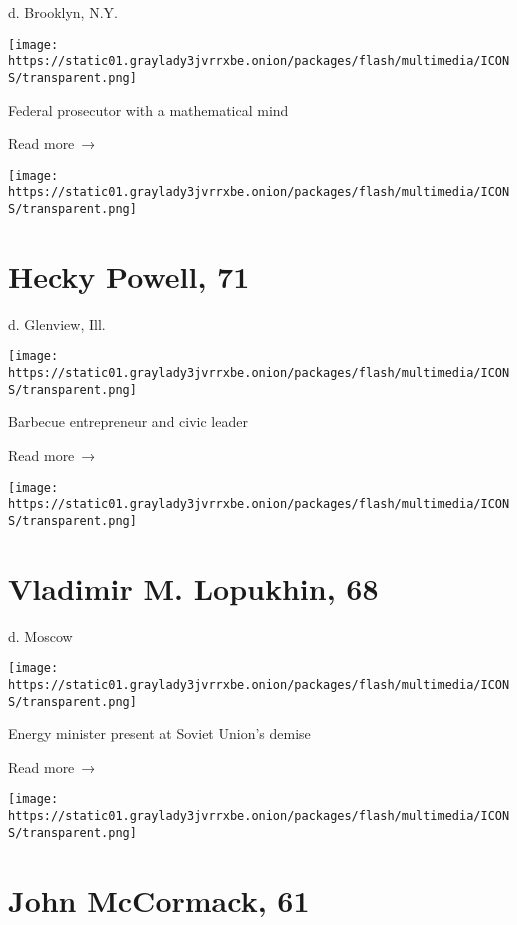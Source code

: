 d. Brooklyn, N.Y.

\texttt{[image: https://static01.graylady3jvrrxbe.onion/packages/flash/multimedia/ICONS/transparent.png]}

Federal prosecutor with a mathematical mind

 Read more~→

\href{https://www.nytimes3xbfgragh.onion/2020/06/04/us/hecky-powell-dead-coronavirus.html}{}

\texttt{[image: https://static01.graylady3jvrrxbe.onion/packages/flash/multimedia/ICONS/transparent.png]}

\hypertarget{hecky-powell-71}{%
\section{Hecky Powell, 71}\label{hecky-powell-71}}

d. Glenview, Ill.

\texttt{[image: https://static01.graylady3jvrrxbe.onion/packages/flash/multimedia/ICONS/transparent.png]}

Barbecue entrepreneur and civic leader

 Read more~→

\href{https://www.nytimes3xbfgragh.onion/2020/06/04/obituaries/vladimir-lopukhin-dead-coronavirus.html}{}

\texttt{[image: https://static01.graylady3jvrrxbe.onion/packages/flash/multimedia/ICONS/transparent.png]}

\hypertarget{vladimir-m-lopukhin-68}{%
\section{Vladimir M. Lopukhin, 68}\label{vladimir-m-lopukhin-68}}

d. Moscow

\texttt{[image: https://static01.graylady3jvrrxbe.onion/packages/flash/multimedia/ICONS/transparent.png]}

Energy minister present at Soviet Union's demise

 Read more~→

\href{https://www.nytimes3xbfgragh.onion/2020/06/04/obituaries/00john-mccormack-dead-coronavirus.html}{}

\texttt{[image: https://static01.graylady3jvrrxbe.onion/packages/flash/multimedia/ICONS/transparent.png]}

\hypertarget{john-mccormack-61}{%
\section{John McCormack, 61}\label{john-mccormack-61}}

